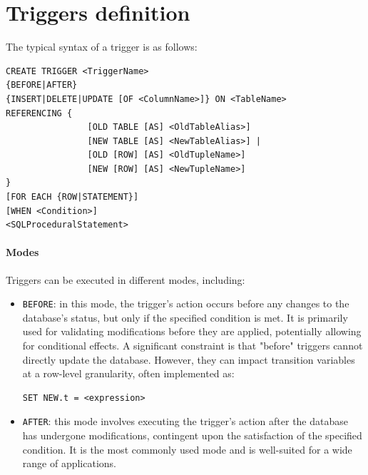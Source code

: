\section{Triggers definition}

The typical syntax of a trigger is as follows:
\begin{lstlisting}[style=SQL]
CREATE TRIGGER <TriggerName>
{BEFORE|AFTER}
{INSERT|DELETE|UPDATE [OF <ColumnName>]} ON <TableName>
REFERENCING { 
                [OLD TABLE [AS] <OldTableAlias>]
                [NEW TABLE [AS] <NewTableAlias>] |
                [OLD [ROW] [AS] <OldTupleName>]
                [NEW [ROW] [AS] <NewTupleName>]
}
[FOR EACH {ROW|STATEMENT}]
[WHEN <Condition>]
<SQLProceduralStatement> 
\end{lstlisting}

\paragraph*{Modes}
Triggers can be executed in different modes, including:
\begin{itemize}
    \item \texttt{BEFORE}: in this mode, the trigger's action occurs before any changes to the database's status, but only if the specified condition is met.
        It is primarily used for validating modifications before they are applied, potentially allowing for conditional effects.
        A significant constraint is that "before" triggers cannot directly update the database. 
        However, they can impact transition variables at a row-level granularity, often implemented as: 
        \begin{lstlisting}[style=SQL]
SET NEW.t = <expression>
        \end{lstlisting}
    \item \texttt{AFTER}: this mode involves executing the trigger's action after the database has undergone modifications, contingent upon the satisfaction of the specified condition.
        It is the most commonly used mode and is well-suited for a wide range of applications.
\end{itemize}

